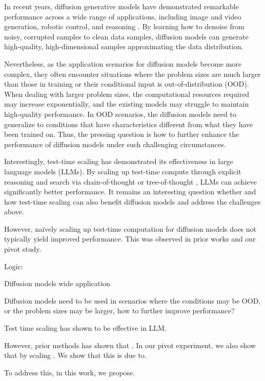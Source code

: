 In recent years, diffusion generative models \cite{sohl2015deep,ho2020denoising,song2021scorebased} have demonstrated remarkable performance across a wide range of applications, including image and video generation, robotic control, and reasoning \cite{du2024learning}. By learning how to denoise from noisy, corrupted samples to clean data samples, diffusion models can generate high-quality, high-dimensional samples approximating the data distribution.

Nevertheless, as the application scenarios for diffusion models become more complex, they often encounter situations where the problem sizes are much larger than those in training or their conditional input is out-of-distribution (OOD). When dealing with larger problem sizes, the computational resources required may increase exponentially, and the existing models may struggle to maintain high-quality performance. In OOD scenarios, the diffusion models need to generalize to conditions that have characteristics different from what they have been trained on. Thus, the pressing question is how to further enhance the performance of diffusion models under such challenging circumstances.

Interestingly, test-time scaling has demonstrated its effectiveness in large language models (LLMs). By scaling up test-time compute through explicit reasoning and search via chain-of-thought \cite{} or tree-of-thought \cite{}, LLMs can achieve significantly better performance. It remains an interesting question whether and how test-time scaling can also benefit diffusion models and address the challenges above.

However, na\"ively scaling up test-time computation for diffusion models does not typically yield improved performance. This was observed in prior works \cite{} and our pivot study. 




Logic:

Diffusion models wide application

Diffusion models need to be used in scenarios where the conditions may be OOD, or the problem sizes may be larger, how to further improve performance?

Test time scaling has shown to be effective in LLM.  

However, prior methods has shown that . In our pivot experiment, we also show that by scaling . We show that this is due to.

To address this, in this work, we propose.


